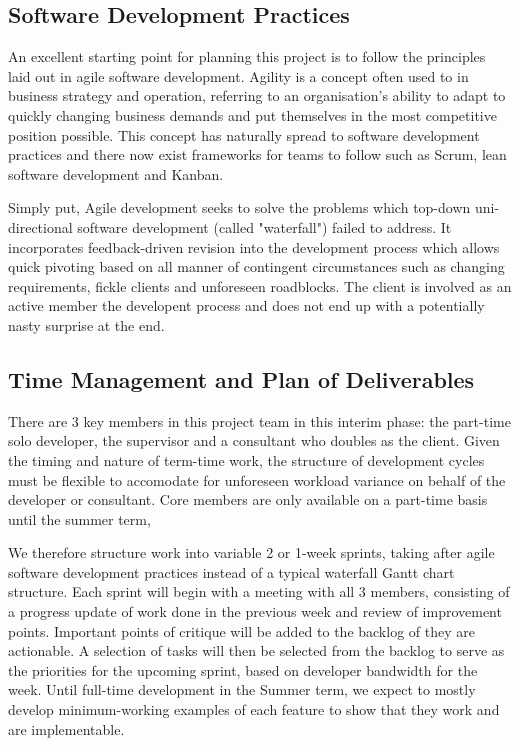 \subsection{Software Development Practices}
An excellent starting point for planning this project is to follow the principles laid out in agile software development. Agility is a concept often used to in business strategy and operation, referring to an organisation's ability to adapt to quickly changing business demands and put themselves in the most competitive position possible. This concept has naturally spread to software development practices and there now exist frameworks for teams to follow such as Scrum, lean software development and Kanban.


Simply put, Agile development seeks to solve the problems which top-down uni-directional software development (called "waterfall") failed to address. It incorporates feedback-driven revision into the development process which allows quick pivoting based on all manner of contingent circumstances such as changing requirements, fickle clients and unforeseen roadblocks. The client is involved as an active member the developent process and does not end up with a potentially nasty surprise at the end.


\subsection{Time Management and Plan of Deliverables}
There are 3 key members in this project team in this interim phase: the part-time solo developer, the supervisor and a consultant who doubles as the client. Given the timing and nature of term-time work, the structure of development cycles must be flexible to accomodate for unforeseen workload variance on behalf of the developer or consultant. Core members are only available on a part-time basis until the summer term,

We therefore structure work into variable 2 or 1-week sprints, taking after agile software development practices instead of a typical waterfall Gantt chart structure. Each sprint will begin with a meeting with all 3 members, consisting of a progress update of work done in the previous week and review of improvement points. Important points of critique will be added to the backlog of they are actionable. A selection of tasks will then be selected from the backlog to serve as the priorities for the upcoming sprint, based on developer bandwidth for the week. Until full-time development in the Summer term, we expect to mostly develop minimum-working examples of each feature to show that they work and are implementable.

